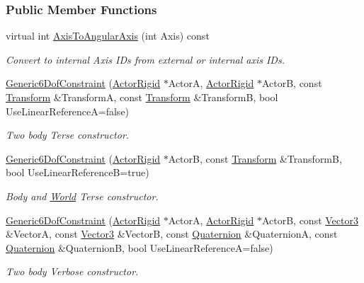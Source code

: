 \subsubsection*{Public Member Functions}
\begin{DoxyCompactItemize}
\item 
virtual int \hyperlink{classphys_1_1Generic6DofConstraint_af162e5336f90991710b11f13afe597ff}{AxisToAngularAxis} (int Axis) const 
\begin{DoxyCompactList}\small\item\em Convert to internal Axis IDs from external or internal axis IDs. \item\end{DoxyCompactList}\item 
\hyperlink{classphys_1_1Generic6DofConstraint_ad8a9920f71bae109782028b5b4efd2e6}{Generic6DofConstraint} (\hyperlink{classphys_1_1ActorRigid}{ActorRigid} $\ast$ActorA, \hyperlink{classphys_1_1ActorRigid}{ActorRigid} $\ast$ActorB, const \hyperlink{classphys_1_1Transform}{Transform} \&TransformA, const \hyperlink{classphys_1_1Transform}{Transform} \&TransformB, bool UseLinearReferenceA=false)
\begin{DoxyCompactList}\small\item\em Two body Terse constructor. \item\end{DoxyCompactList}\item 
\hyperlink{classphys_1_1Generic6DofConstraint_a2c698627fca383ba0016230e633eba1f}{Generic6DofConstraint} (\hyperlink{classphys_1_1ActorRigid}{ActorRigid} $\ast$ActorB, const \hyperlink{classphys_1_1Transform}{Transform} \&TransformB, bool UseLinearReferenceB=true)
\begin{DoxyCompactList}\small\item\em Body and \hyperlink{classphys_1_1World}{World} Terse constructor. \item\end{DoxyCompactList}\item 
\hyperlink{classphys_1_1Generic6DofConstraint_a11c55cac8afd64f0c290d6d805e6cd8b}{Generic6DofConstraint} (\hyperlink{classphys_1_1ActorRigid}{ActorRigid} $\ast$ActorA, \hyperlink{classphys_1_1ActorRigid}{ActorRigid} $\ast$ActorB, const \hyperlink{classphys_1_1Vector3}{Vector3} \&VectorA, const \hyperlink{classphys_1_1Vector3}{Vector3} \&VectorB, const \hyperlink{classphys_1_1Quaternion}{Quaternion} \&QuaternionA, const \hyperlink{classphys_1_1Quaternion}{Quaternion} \&QuaternionB, bool UseLinearReferenceA=false)
\begin{DoxyCompactList}\small\item\em Two body Verbose constructor. \item\end{DoxyCompactList}\item 

\end{DoxyCompactItemize}
